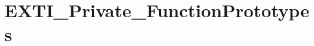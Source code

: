 \hypertarget{group___e_x_t_i___private___function_prototypes}{\section{E\-X\-T\-I\-\_\-\-Private\-\_\-\-Function\-Prototypes}
\label{group___e_x_t_i___private___function_prototypes}
}
